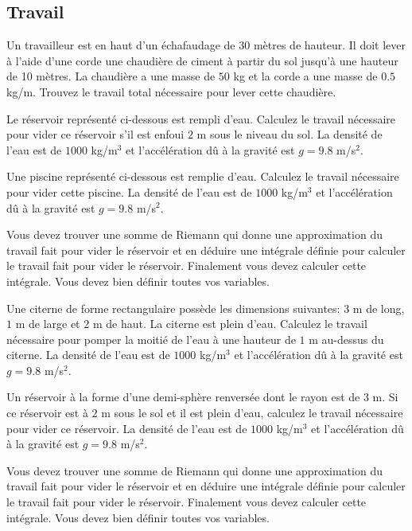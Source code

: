 \subsection{Travail}

\begin{question}[\eng]
Un travailleur est en haut d'un échafaudage de $30$ mètres de
hauteur.  Il doit lever à l'aide d'une corde une chaudière de
ciment à partir du sol jusqu'à une hauteur de 10 mètres.  La
chaudière a une masse de $50$ kg et la corde a une masse de $0.5$
kg/m.  Trouvez le travail total nécessaire pour lever cette
chaudière.
\label{8Q19}
\end{question}

\begin{question}
Le réservoir représenté ci-dessous est rempli d'eau.
Calculez le travail nécessaire pour vider ce réservoir s'il est enfoui
$2$ m sous le niveau du sol.  La densité de l'eau est de $1000$
kg/m$^3$ et l'accélération dû à la gravité est $g=9.8$ m/s$^2$.
\label{8Q20}
\end{question}

\begin{question}[\eng]
Une piscine représenté ci-dessous est remplie d'eau.  Calculez
le travail nécessaire pour vider cette piscine.  La densité de l'eau
est de $1000$ kg/m$^3$ et l'accélération dû à la gravité est $g=9.8$
m/s$^2$.

Vous devez trouver une somme de Riemann qui donne une approximation du
travail fait pour vider le réservoir et en déduire une intégrale
définie pour calculer le travail fait pour vider le
réservoir. Finalement vous devez calculer cette intégrale. 
Vous devez bien définir toutes vos variables.
\label{8Q21}
\end{question}

\begin{question}[\eng]
Une citerne de forme rectangulaire possède les dimensions suivantes:
$3$ m de long, $1$ m de large et $2$ m de haut.  La citerne est plein
d'eau.  Calculez le travail nécessaire pour pomper la moitié de l'eau
à une hauteur de $1$ m au-dessus du citerne.  La densité de l'eau est
de $1000$ kg/m$^3$ et l'accélération dû à la gravité est $g=9.8$
m/s$^2$.
\label{8Q22}
\end{question}

\begin{question}[\eng]
Un réservoir à la forme d'une demi-sphère renversée dont le rayon est
de $3$ m.
Si ce réservoir est à $2$ m sous le sol et il est plein d'eau,
calculez le travail nécessaire pour vider ce réservoir.  La densité de
l'eau est de $1000$ kg/m$^3$ et l'accélération dû à la gravité est
$g=9.8$ m/s$^2$.

Vous devez trouver une somme de Riemann qui donne une approximation du
travail fait pour vider le réservoir et en déduire une intégrale
définie pour calculer le travail fait pour vider le
réservoir. Finalement vous devez calculer cette intégrale. 
Vous devez bien définir toutes vos variables.
\label{8Q23}
\end{question}

